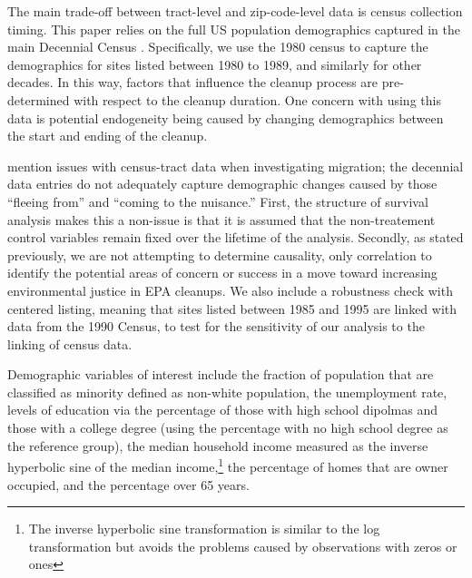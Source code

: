 \documentclass[12pt]{article}
\begin{document}
The main trade-off between tract-level and zip-code-level data is census collection timing. This paper relies on the full US population demographics captured in the main Decennial Census \parencite{USCensus}. Specifically, we use the 1980 census to capture the demographics for sites listed between 1980 to 1989, and similarly for other decades. In this way, factors that influence the cleanup process are pre-determined with respect to the cleanup duration. One concern with using this data is potential endogeneity being caused by changing demographics between the start and ending of the cleanup. {\textcite{Depro2015} mention issues with census-tract data when investigating migration; the decennial data entries do not adequately capture demographic changes caused by those ``fleeing from'' and ``coming to the nuisance.'' First, the structure of survival analysis makes this a non-issue is that it is assumed that the non-treatement control variables remain fixed over the lifetime of the analysis. Secondly, as stated previously, we are not attempting to determine causality, only correlation to identify the potential areas of concern or success in a move toward increasing environmental justice in EPA cleanups. We also include a robustness check with centered listing, meaning that sites listed between 1985 and 1995 are linked with data from the 1990 Census, to test for the sensitivity of our analysis to the linking of census data. 


Demographic variables of interest include the fraction of population that are classified as minority defined as non-white population, the unemployment rate, levels of education via the percentage of those with high school dipolmas and those with a college degree (using the percentage with no high school degree as the reference group), the median household income measured as the inverse hyperbolic sine of the median income,\footnote{The inverse hyperbolic sine transformation is similar to the log transformation but avoids the problems caused by observations with zeros or ones} the percentage of homes that are owner occupied, and the percentage over 65 years. %

}
\end{document}

